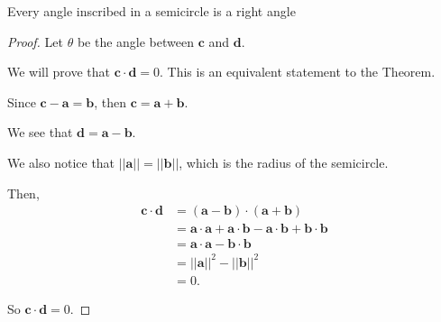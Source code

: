 \documentclass[../hw9]{subfiles}
\begin{document}
\begin{theorem}
    Every angle inscribed in a semicircle is a right angle
\end{theorem}

\begin{figure*}[ht]
\centering
{}
\end{figure*}

\begin{proof}
    Let $\theta$ be the angle between $\mathbf{c}$ and $\mathbf{d}$.

    We will prove that $\mathbf{c}\cdot\mathbf{d}=0$. This is an equivalent statement to the Theorem.

    Since $\mathbf{c}-\mathbf{a}=\mathbf{b}$, then $\mathbf{c}=\mathbf{a}+\mathbf{b}$.

    We see that $\mathbf{d}=\mathbf{a}-\mathbf{b}$.

    We also notice that $||\mathbf{a}||=||\mathbf{b}||$, which is the radius of the semicircle.

    Then,
    \begin{align*}
        \mathbf{c}\cdot \mathbf{d}&=(\mathbf{a}-\mathbf{b})\cdot(\mathbf{a}+\mathbf{b})\\
        &=\mathbf{a}\cdot\mathbf{a}+\mathbf{a}\cdot\mathbf{b}-\mathbf{a}\cdot\mathbf{b}+\mathbf{b}\cdot\mathbf{b}\\
        &=\mathbf{a}\cdot\mathbf{a}-\mathbf{b}\cdot\mathbf{b}\\
        &={||\mathbf{a}||}^2-{||\mathbf{b}||}^2\\
        &=0.
    \end{align*}

    So $\mathbf{c}\cdot\mathbf{d}=0$.
\end{proof}
\end{document}
